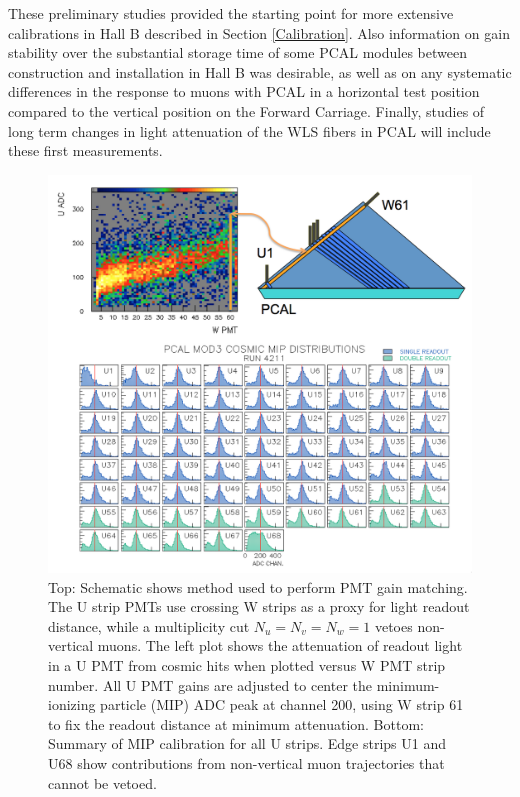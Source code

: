 These preliminary studies provided the starting point for more extensive calibrations in Hall B described in
Section \ref{Calibration}. Also information on gain stability over the substantial storage time of some PCAL
modules between construction and installation in Hall B was desirable, as well as on any systematic differences in
the response to muons with PCAL in a horizontal test position compared to the vertical position on the Forward
Carriage. Finally, studies of long term changes in light attenuation of the WLS fibers in PCAL will include these
first measurements.

\begin{figure}[hbt]
\centering
\includegraphics[width=0.95\columnwidth,keepaspectratio]{img/S5_4.png}
\caption{Top: Schematic shows method used to perform PMT gain matching. The U strip PMTs use crossing W
  strips as a proxy for light readout distance, while a multiplicity cut $N_u=N_v=N_w=1$ vetoes non-vertical muons.
  The left plot shows the attenuation of readout light in a U PMT from cosmic hits when plotted versus W PMT strip
  number. All U PMT gains are adjusted to center the minimum-ionizing particle (MIP) ADC peak at channel 200,
  using W strip 61 to fix the readout distance at minimum attenuation. Bottom: Summary of MIP calibration for all
  U strips. Edge strips U1 and U68 show contributions from non-vertical muon trajectories that cannot be vetoed.}
\label{fig:S5_4}
\end{figure}

